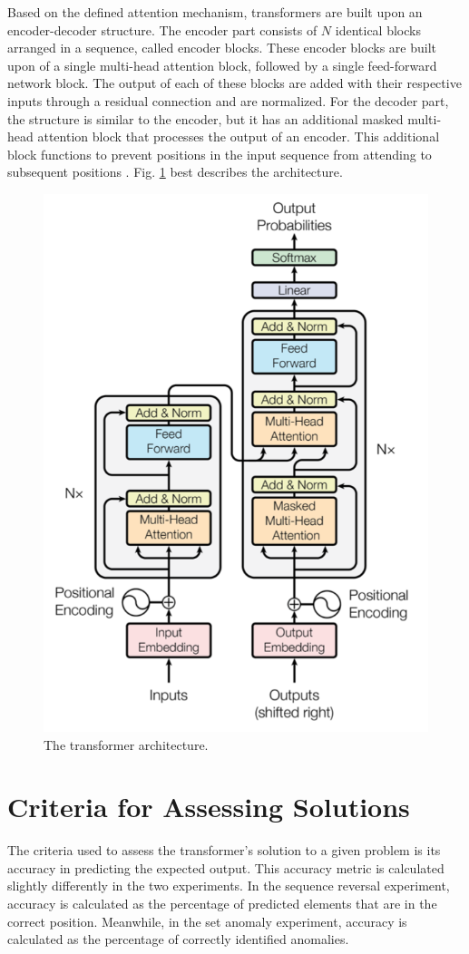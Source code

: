 \documentclass[peerreview]{IEEEtran}
\begin{document}
Based on the defined attention mechanism, transformers are built upon an encoder-decoder structure. The encoder part consists of $N$ identical blocks arranged in a sequence, called encoder blocks. These encoder blocks are built upon of a single multi-head attention block, followed by a single feed-forward network block. The output of each of these blocks are added with their respective inputs through a residual connection and are normalized. For the decoder part, the structure is similar to the encoder, but it has an additional masked multi-head attention block that processes the output of an encoder. This additional block functions to prevent positions in the input sequence from attending to subsequent positions \cite{vaswani_2017}. Fig. \ref{fig_transformer} best describes the architecture.
\begin{figure}[!h]
\centering
\includegraphics[width=0.8\columnwidth]{transformer} 
\caption{The transformer architecture.}
\label{fig_transformer}
\end{figure}

\section{Criteria for Assessing Solutions} \label{sec:criteria}
The criteria used to assess the transformer's solution to a given problem is its accuracy in predicting the expected output. This accuracy metric is calculated slightly differently in the two experiments. In the sequence reversal experiment, accuracy is calculated as the percentage of predicted elements that are in the correct position. Meanwhile, in the set anomaly experiment, accuracy is calculated as the percentage of correctly identified anomalies. 
\end{document}
